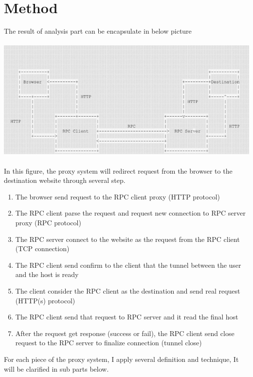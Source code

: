\documentclass{article}
\begin{document}
\section{Method}
The result of analysis part can be encapsulate in below picture
\\
\\
\includegraphics[scale=0.5]{RPC_method}
\\
\\
In this figure, the proxy system will redirect request from the browser
to the destination website through several step.
\begin{enumerate}
\item The browser send request to the RPC client proxy (HTTP protocol)
\item The RPC client parse the request and request new connection to RPC
server proxy (RPC protocol)
\item The RPC server connect to the website as the request from the RPC
client (TCP connection)
\item The RPC client send confirm to the client that the tunnel between
the user and the host is ready
\item The client consider the RPC client as the destination and send
real request (HTTP(s) protocol)
\item The RPC client send that request to RPC server and it read the final
host
\item After the request get response (success or fail), the RPC client send
close request to the RPC server to finalize connection (tunnel close)
\end{enumerate}
For each piece of the proxy system, I apply several definition and technique,
It will be clarified in sub parts below. 
\end{document}
